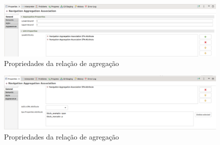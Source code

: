 \documentclass[
article,			%
11pt,				%
oneside,			%
a4paper,			%
english,			%
brazil,				%
sumario=tradicional
]{abntex2}
\begin{document}
\begin{figure}
	\centering
	\includegraphics[width=0.7\linewidth]{figuras/menu3}
	\caption{Propriedades da relação de agregação}
	\label{fig:menu3}
\end{figure}

\begin{figure}
	\centering
	\includegraphics[width=0.7\linewidth]{figuras/menu4}
	\caption{Propriedades da relação de agregação}
	\label{fig:menu4}
\end{figure}








\end{document}
